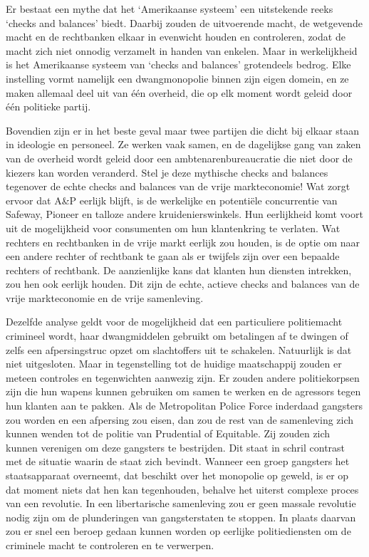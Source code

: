 \documentclass[
  a5paper,
  smalldemyvopaper,10pt,twoside,onecolumn,openright,extrafontsizes,hidelinks]{memoir}
\begin{document}
Er bestaat een mythe dat het `Amerikaanse systeem' een uitstekende reeks
`checks and balances' biedt. Daarbij zouden de uitvoerende macht, de
wetgevende macht en de rechtbanken elkaar in evenwicht houden en
controleren, zodat de macht zich niet onnodig verzamelt in handen van
enkelen. Maar in werkelijkheid is het Amerikaanse systeem van `checks
and balances' grotendeels bedrog. Elke instelling vormt namelijk een
dwangmonopolie binnen zijn eigen domein, en ze maken allemaal deel uit
van één overheid, die op elk moment wordt geleid door één politieke
partij.

Bovendien zijn er in het beste geval maar twee partijen die dicht bij
elkaar staan in ideologie en personeel. Ze werken vaak samen, en de
dagelijkse gang van zaken van de overheid wordt geleid door een
ambtenarenbureaucratie die niet door de kiezers kan worden veranderd.
Stel je deze mythische checks and balances tegenover de echte checks and
balances van de vrije markteconomie! Wat zorgt ervoor dat A\&P eerlijk
blijft, is de werkelijke en potentiële concurrentie van Safeway, Pioneer
en talloze andere kruidenierswinkels. Hun eerlijkheid komt voort uit de
mogelijkheid voor consumenten om hun klantenkring te verlaten. Wat
rechters en rechtbanken in de vrije markt eerlijk zou houden, is de
optie om naar een andere rechter of rechtbank te gaan als er twijfels
zijn over een bepaalde rechters of rechtbank. De aanzienlijke kans dat
klanten hun diensten intrekken, zou hen ook eerlijk houden. Dit zijn de
echte, actieve checks and balances van de vrije markteconomie en de
vrije samenleving.

Dezelfde analyse geldt voor de mogelijkheid dat een particuliere
politiemacht crimineel wordt, haar dwangmiddelen gebruikt om betalingen
af te dwingen of zelfs een afpersingstruc opzet om slachtoffers uit te
schakelen. Natuurlijk is dat niet uitgesloten. Maar in tegenstelling tot
de huidige maatschappij zouden er meteen controles en tegenwichten
aanwezig zijn. Er zouden andere politiekorpsen zijn die hun wapens
kunnen gebruiken om samen te werken en de agressors tegen hun klanten
aan te pakken. Als de Metropolitan Police Force inderdaad gangsters zou
worden en een afpersing zou eisen, dan zou de rest van de samenleving
zich kunnen wenden tot de politie van Prudential of Equitable. Zij
zouden zich kunnen verenigen om deze gangsters te bestrijden. Dit staat
in schril contrast met de situatie waarin de staat zich bevindt. Wanneer
een groep gangsters het staatsapparaat overneemt, dat beschikt over het
monopolie op geweld, is er op dat moment niets dat hen kan tegenhouden,
behalve het uiterst complexe proces van een revolutie. In een
libertarische samenleving zou er geen massale revolutie nodig zijn om de
plunderingen van gangsterstaten te stoppen. In plaats daarvan zou er
snel een beroep gedaan kunnen worden op eerlijke politiediensten om de
criminele macht te controleren en te verwerpen.
\end{document}
